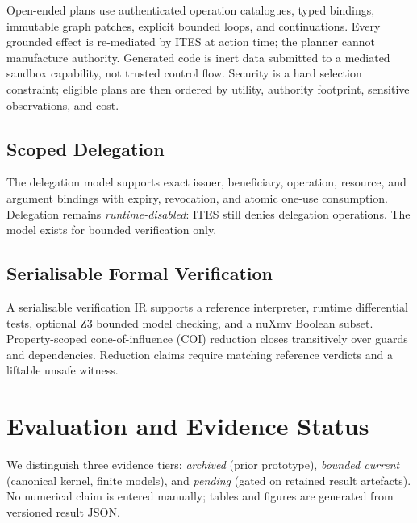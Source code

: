 \documentclass{article}
\begin{document}
Open-ended plans use authenticated operation catalogues, typed bindings,
immutable graph patches, explicit bounded loops, and continuations. Every
grounded effect is re-mediated by ITES at action time; the planner cannot
manufacture authority. Generated code is inert data submitted to a mediated
sandbox capability, not trusted control flow. Security is a hard selection
constraint; eligible plans are then ordered by utility, authority
footprint, sensitive observations, and cost.

\subsection{Scoped Delegation}

The delegation model supports exact issuer, beneficiary, operation,
resource, and argument bindings with expiry, revocation, and atomic
one-use consumption. Delegation remains \emph{runtime-disabled}: ITES still
denies delegation operations. The model exists for bounded verification
only.

\subsection{Serialisable Formal Verification}

A serialisable verification IR supports a reference interpreter, runtime
differential tests, optional Z3 bounded model checking, and a nuXmv
Boolean subset. Property-scoped cone-of-influence (COI) reduction closes
transitively over guards and dependencies. Reduction claims require matching
reference verdicts and a liftable unsafe witness.






\section{Evaluation and Evidence Status}

We distinguish three evidence tiers: \emph{archived} (prior prototype),
\emph{bounded current} (canonical kernel, finite models), and \emph{pending}
(gated on retained result artefacts). No numerical claim is entered
manually; tables and figures are generated from versioned result JSON.




\end{document}
